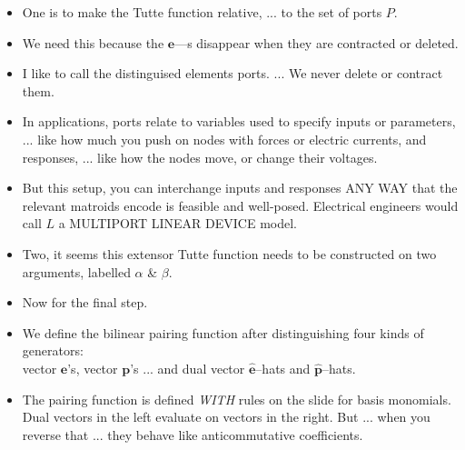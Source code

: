 \documentclass[14pt]{extarticle}
\begin{document}
{\begin{itemize}
\item
One is to make the Tutte function relative, ... to the set of ports $P$.

\item
  We need this because the $\mathbf{e}$---s  disappear when they are contracted or deleted.

\item
  I like to call the distinguised elements ports. ... We never delete or contract them.


\item In applications, ports relate to variables used to specify inputs
  or parameters, ... like how much you push on nodes with forces or electric currents,
  and responses, ... like how the nodes move, or change their voltages.

\item But this setup, you can interchange inputs and responses ANY WAY that the
  relevant matroids encode is feasible and well-posed.  Electrical engineers would
  call $L$ a MULTIPORT LINEAR DEVICE model.


\item
  Two, it seems this extensor Tutte function needs to be constructed on 
  two arguments, labelled $\alpha$ \& $\beta$.


\item Now for the final step.

\item
  We define the bilinear pairing function 
  after distinguishing  
  four kinds of generators:\\
  vector $\mathbf{e}$'s, vector $\mathbf{p}$'s ... and
dual vector $\widehat{\mathbf{e}}$--hats and $\widehat{\mathbf{p}}$--hats.  

\item
  The pairing function is defined \emph{WITH} rules on the slide for basis monomials.  Dual vectors
  in the left evaluate on vectors in the right.   But ... when you reverse that ... 
  they behave like anticommutative coefficients.


\end{itemize}}
\end{document}
